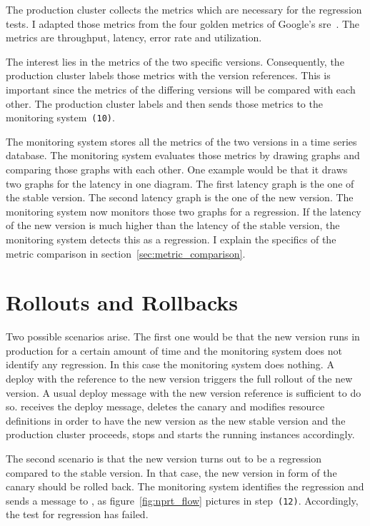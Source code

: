 The production cluster collects the metrics which are necessary for the regression tests.
I adapted those metrics from the four golden metrics of Google's
\gls{sre}~\cite{sre_monitoring}. The metrics are throughput, latency, error rate and
utilization.

The interest lies in the metrics of the two specific versions. Consequently, the production
cluster labels those metrics with the version references. This is important since the
metrics of the differing versions will be compared with each other. The production cluster
labels and then sends those metrics to the monitoring system~\texttt{(10)}.

The monitoring system stores all the metrics of the two versions in a time series
database. The monitoring system evaluates those metrics by drawing graphs and comparing
those graphs with each other. One example would be that it draws two graphs for the
latency in one diagram. The first latency graph is the one of the stable version. The
second latency graph is the one of the new version. The monitoring system now monitors
those two graphs for a regression. If the latency of the new
version is much higher than the latency of the stable version, the monitoring system
detects this as a regression. I explain the specifics of the metric comparison in
section~\ref{sec:metric_comparison}.

\section{Rollouts and Rollbacks}

Two possible scenarios arise. The first one would be that the new version runs in
production for a certain amount of time and the monitoring system does not identify any
regression. In this case the monitoring system does nothing. A deploy with the reference
to the new version triggers the full rollout of the new version. A usual deploy message
with the new version reference is sufficient to do so. \deployer{} receives the deploy
message, deletes the canary and modifies resource definitions in order to have the new version as
the new stable version and the production cluster proceeds, stops and starts the running
instances accordingly.

The second scenario is that the new version turns out to be a regression compared to the
stable version. In that case, the new version in form of the canary should be rolled
back. The monitoring system identifies the regression and sends a message to \deployer{}, as
figure~\ref{fig:nprt_flow} pictures in step~\texttt{(12)}. Accordingly, the test for
regression has failed.


